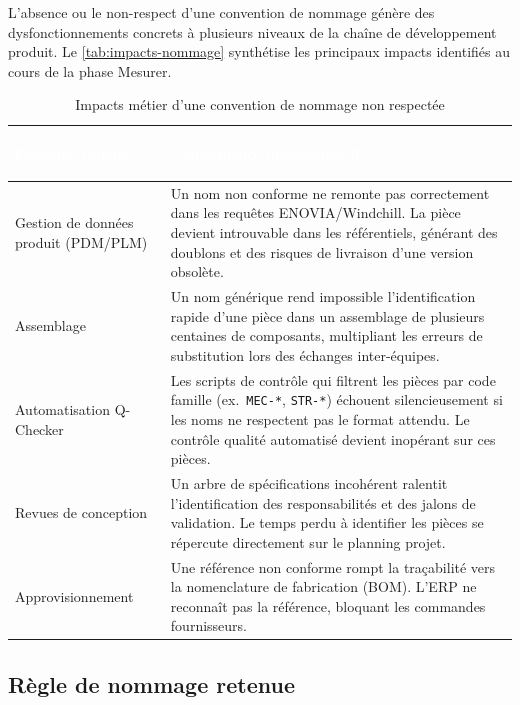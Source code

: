 L'absence ou le non-respect d'une convention de nommage génère des dysfonctionnements concrets à plusieurs niveaux de la chaîne de développement produit. Le \autoref{tab:impacts-nommage} synthétise les principaux impacts identifiés au cours de la phase Mesurer.

\begin{table}[H]
    \centering
    \caption{Impacts métier d'une convention de nommage non respectée}
    \label{tab:impacts-nommage}
    \begin{tabularx}{\textwidth}{|>{\bfseries\raggedright\arraybackslash}p{3.8cm}|X|}
        \hline
        \rowcolor{headerblue}
        \textcolor{white}{\textbf{Domaine impacté}} & \centering\textcolor{white}{\textbf{Conséquence opérationnelle}} \tabularnewline
        \hline
        \rowcolor{rowlight}
        Gestion de données produit (PDM/PLM) & Un nom non conforme ne remonte pas correctement dans les requêtes ENOVIA/Wind\-chill. La pièce devient introuvable dans les référentiels, générant des doublons et des risques de livraison d'une version obsolète. \\
        \hline
        \rowcolor{rowwhite}
        Assemblage & Un nom générique rend impossible l'identification rapide d'une pièce dans un assemblage de plusieurs centaines de composants, multipliant les erreurs de substitution lors des échanges inter-équipes. \\
        \hline
        \rowcolor{rowlight}
        Automatisation Q-Checker & Les scripts de contrôle qui filtrent les pièces par code famille (ex.\ \texttt{MEC-*}, \texttt{STR-*}) échouent silencieusement si les noms ne respectent pas le format attendu. Le contrôle qualité automatisé devient inopérant sur ces pièces. \\
        \hline
        \rowcolor{rowwhite}
        Revues de conception & Un arbre de spécifications incohérent ralentit l'identification des responsabilités et des jalons de validation. Le temps perdu à identifier les pièces se répercute directement sur le planning projet. \\
        \hline
        \rowcolor{rowlight}
        Approvisionnement & Une référence non conforme rompt la traçabilité vers la nomenclature de fabrication (BOM). L'ERP ne reconnaît pas la référence, bloquant les commandes fournisseurs. \\
        \hline
    \end{tabularx}
\end{table}

\subsection{Règle de nommage retenue}


